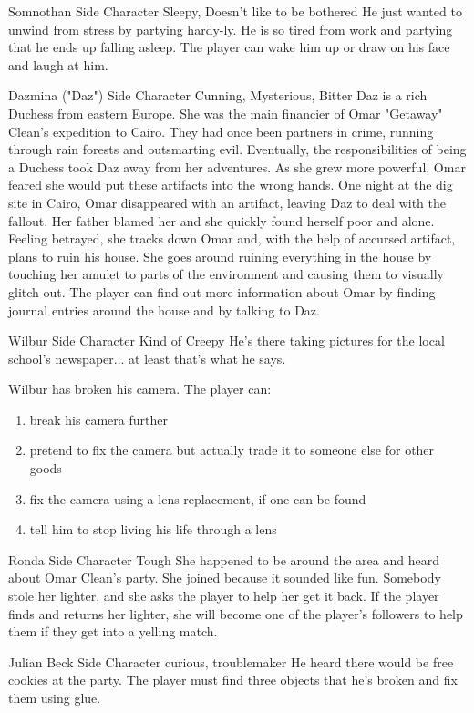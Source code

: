{Somnothan}
{Side Character}
{Sleepy, Doesn't like to be bothered}
{He just wanted to unwind from stress by partying hardy-ly. }
{He is so tired from work and partying that he ends up falling asleep. The player can wake him up or draw on his face and laugh at him.}

{Dazmina ("Daz")}
{Side Character}
{Cunning, Mysterious, Bitter}
{Daz is a rich Duchess from eastern Europe. She was the main financier of Omar "Getaway" Clean's expedition to Cairo. They had once been partners in crime, running through rain forests and outsmarting evil. Eventually, the responsibilities of being a Duchess took Daz away from her adventures. As she grew more powerful, Omar feared she would put these artifacts into the wrong hands. One night at the dig site in Cairo, Omar disappeared with an artifact, leaving Daz to deal with the fallout. Her father blamed her and she quickly found herself poor and alone. Feeling betrayed, she tracks down Omar and, with the help of accursed artifact, plans to ruin his house.}
{She goes around ruining everything in the house by touching her amulet to parts of the environment and causing them to visually glitch out. The player can find out more information about Omar by finding journal entries around the house and by talking to Daz.}

{Wilbur}
{Side Character}
{Kind of Creepy}
{He's there taking pictures for the local school's newspaper... at least that's what he says.}
{Wilbur has broken his camera. The player can:
\begin{enumerate}
\item{break his camera further}
\item{pretend to fix the camera but actually trade it to someone else for other goods}
\item{fix the camera using a lens replacement, if one can be found}
\item{tell him to stop living his life through a lens}
\end{enumerate}
}

{Ronda}
{Side Character}
{Tough}
{She happened to be around the area and heard about Omar Clean's party. She joined because it sounded like fun.}
{Somebody stole her lighter, and she asks the player to help her get it back. If the player finds and returns her lighter, she will become one of the player's followers to help them if they get into a yelling match.
}

{Julian Beck}
{Side Character}
{curious, troublemaker}
{He heard there would be free cookies at the party.}
{The player must find three objects that he's broken and fix them using glue.}

